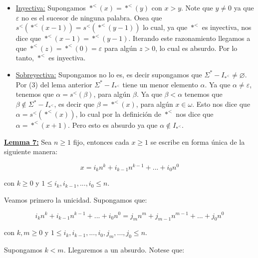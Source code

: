     \begin{itemize}
      \item \underline{Inyectiva:} Supongamos $\ast^{<}(x) = \ast^{<}(y)$ con $x > y$. Note que $y \neq 0$ ya que
      $\varepsilon$ no es el sucesor de ninguna palabra. Osea que $s^{<}(\ast^{<}(x-1)) = s^{<}(\ast^{<}(y-1))$ lo
      cual, ya que $\ast^{<}$ es inyectiva, nos dice que $\ast^{<}(x-1) = \ast^{<}(y-1)$. Iterando este razonamiento
      llegamos a que $\ast^{<}(z) = \ast^{<}(0) = \varepsilon$ para algún $z > 0$, lo cual es absurdo. Por lo tanto,
      $\ast^{<}$ es inyectiva.

      \item \underline{Sobreyectiva:} Supongamos no lo es, es decir supongamos que $\Sigma^{\ast}-I_{\ast^{<}} \neq
      \varnothing$. Por (3) del lema anterior $\Sigma^{\ast}-I_{\ast^{<}}$ tiene un menor elemento $\alpha$. Ya que
      $\alpha \neq \varepsilon$, tenemos que $\alpha = s^{<}(\beta)$, para algún $\beta$. Ya que $\beta < \alpha$
      tenemos que $\beta \notin \Sigma^{\ast}-I_{\ast^{<}}$, es decir que $\beta = \ast^{<}(x)$, para algún $x \in
      \omega$. Esto nos dice que $\alpha = s^{<}(\ast^{<}(x))$, lo cual por la definición de $\ast^{<}$ nos dice que
      $\alpha = \ast^{<}(x+1)$. Pero esto es absurdo ya que $\alpha \notin I_{\ast^{<}}$.

    \end{itemize}

  \QED


  \textbf{\underline{Lemma 7:}} Sea $n \geq 1$ fijo, entonces cada $x \geq 1$ se escribe en forma única de la siguiente
    manera:

    \[
      x = i_{k} n^{k} + i_{k-1} n^{k-1} + ... + i_{0} n^{0}
    \]

    \par con $k\geq 0$ y $1\leq i_{k}, i_{k-1},...,i_{0}\leq n$.

  \PROOF Veamos primero la unicidad. Supongamos que:

    \[
      i_{k} n^{k} + i_{k-1} n^{k-1} + ... + i_{0} n^{0} = j_{m} n^{m} + j_{m-1} n^{m-1} + ... + j_{0} n^{0}
    \]

    \par con $k, m \geq 0$ y $1 \leq i_{k}, i_{k-1}, ..., i_{0}, j_{m}, ..., j_{0} \leq n$.

    \vspace{3mm}
    \par Supongamos $k < m$. Llegaremos a un absurdo. Notese que:

